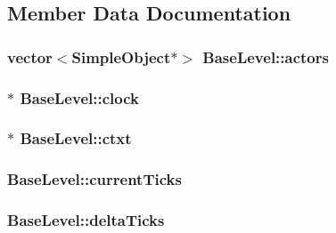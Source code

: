 \subsection{Member Data Documentation}
\hypertarget{class_base_level_afdb8847455ffc5ef1117e095f7b643f5}{
\subsubsection[{actors}]{\setlength{\rightskip}{0pt plus 5cm}vector$<${\bf Simple\-Object}$\ast$$>$ Base\-Level\-::actors}}\label{class_base_level_afdb8847455ffc5ef1117e095f7b643f5}
\hypertarget{class_base_level_ad687a06859d9aae04e2b836fe7538be3}{
\subsubsection[{clock}]{$\ast$ Base\-Level\-::clock}}\label{class_base_level_ad687a06859d9aae04e2b836fe7538be3}
\hypertarget{class_base_level_abb9b05b9478873351f7dabb0dd0a0710}{
\subsubsection[{ctxt}]{$\ast$ Base\-Level\-::ctxt}}\label{class_base_level_abb9b05b9478873351f7dabb0dd0a0710}
\hypertarget{class_base_level_a754e65e0bf394364ae1afb6eebb117ac}{
\subsubsection[{current\-Ticks}]{ Base\-Level\-::current\-Ticks}}\label{class_base_level_a754e65e0bf394364ae1afb6eebb117ac}
\hypertarget{class_base_level_a656e66f797ef9e923792f8bbba09bcf0}{
\subsubsection[{delta\-Ticks}]{ Base\-Level\-::delta\-Ticks}}\label{class_base_level_a656e66f797ef9e923792f8bbba09bcf0}
